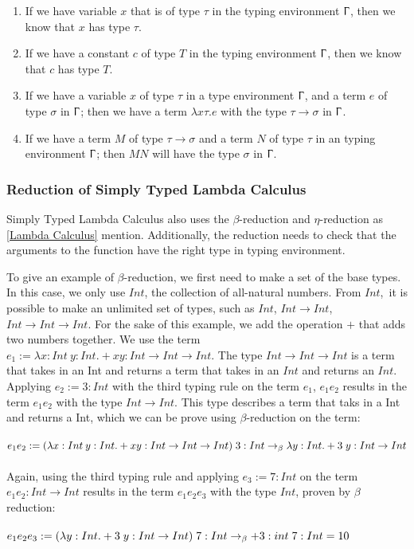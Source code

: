\begin{enumerate}
    \item If we have variable $x$ that is of type $\tau$ in the typing environment $\Upgamma$, then we know that $x$ has type $\tau$.
    \item If we have a constant $c$ of type $T$ in the typing environment $\Upgamma$, then we know that $c$ has type $T$.
    \item If we have a variable $x$ of type $\tau$ in a type environment $\Upgamma$, and a term $e$ of type $\sigma$ in $\Upgamma$; then we have a term $\lambda x\tau .e$ with the type $\tau \rightarrow \sigma$ in $\Upgamma$.
    \item If we have a term $M$ of type $\tau \rightarrow \sigma$ and a term $N$ of type $\tau$ in an typing environment $\Upgamma$; then $M N$ will have the type $\sigma$ in $\Upgamma$.
\end{enumerate}

\subsubsection{Reduction of Simply Typed Lambda Calculus}
Simply Typed Lambda Calculus also uses the $\beta$-reduction and $\eta$-reduction as \autoref{Lambda Calculus} mention. Additionally, the reduction needs to check that the arguments to the function have the right type in typing environment. 

\para
To give an example of $\beta$-reduction, we first need to make a set of the base types. In this case, we only use $Int$, the collection of all-natural numbers. From $Int$, it is possible to make an unlimited set of types, such as $Int$, $Int \rightarrow Int$, $Int \rightarrow Int \rightarrow Int$. For the sake of this example, we add the operation $+$ that adds two numbers together. We use the term $e_1:= \lambda x:Int\: y:Int. + x y:Int \rightarrow Int \rightarrow Int$. The type $Int \rightarrow Int \rightarrow Int$ is a term that takes in an Int and returns a term that takes in an $Int$ and returns an $Int$. Applying $e_2 := 3:Int$ with the third typing rule on the term $e_1$, $e_1 e_2$ results in the term $e_1 e_2$ with the type $Int \rightarrow Int$. This type describes a term that taks in a Int and returns a Int, which we can be prove using $\beta$-reduction on the term:
\\ \\
$e_1 e_2 := (\lambda x:Int\: y:Int. + x y:Int \rightarrow Int \rightarrow Int)\; 3:Int 
\newline\rightarrow_\beta \lambda y:Int. + 3\; y: Int \rightarrow Int$
\\ \\
Again, using the third typing rule and applying $e_3 := 7:Int$ on the term $e_1 e_2:Int \rightarrow Int$ results in the term $e_1 e_2 e_3$ with the type $Int$, proven by $\beta$ reduction: 
\\ \\
$e_1 e_2 e_3 := (\lambda y:Int. + 3\; y: Int \rightarrow Int) \; 7:Int
\newline \rightarrow_\beta + 3:int \; 7:Int = 10$

